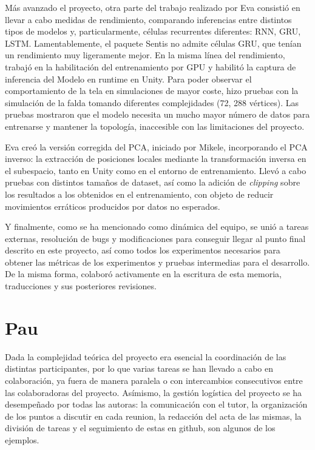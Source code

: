 Más avanzado el proyecto, otra parte del trabajo realizado por Eva consistió en llevar a cabo medidas de rendimiento, comparando inferencias entre distintos tipos de modelos y, particularmente, células recurrentes diferentes: RNN, GRU, LSTM. Lamentablemente, el paquete Sentis no admite células GRU, que tenían un rendimiento muy ligeramente mejor. En la misma línea del rendimiento, trabajó en la habilitación del entrenamiento por GPU y habilitó la captura de inferencia del Modelo en runtime en Unity.
Para poder observar el comportamiento de la tela en simulaciones de mayor coste, hizo pruebas con la simulación de la falda tomando diferentes complejidades (72, 288 vértices). Las pruebas mostraron que el modelo necesita un mucho mayor número de datos para entrenarse y mantener la topología, inaccesible con las limitaciones del proyecto. \newline

Eva creó la versión corregida del PCA, iniciado por Mikele, incorporando el PCA inverso: la extracción de posiciones locales mediante la transformación inversa en el subespacio, tanto en Unity como en el entorno de entrenamiento. Llevó a cabo pruebas con distintos tamaños de dataset, así como la adición de \textit{clipping} sobre los resultados a los obtenidos en el entrenamiento, con objeto de reducir movimientos erráticos producidos por datos no esperados. \newline

Y finalmente, como se ha mencionado como dinámica del equipo, se unió a tareas externas, resolución de bugs y modificaciones para conseguir llegar al punto final descrito en este proyecto, así como todos los experimentos necesarios para obtener las métricas de los experimentos y pruebas intermedias para el desarrollo. De la misma forma, colaboró activamente en la escritura de esta memoria, traducciones y sus posteriores revisiones.

\newpage
\section*{Pau}
Dada la complejidad teórica del proyecto era esencial la coordinación de las distintas participantes, por lo que varias tareas se han llevado a cabo en colaboración, ya fuera de manera paralela o con intercambios consecutivos entre las colaboradoras del proyecto. Asímismo, la gestión logística del proyecto se ha desempeñado por todas las autoras: la comunicación con el tutor, la organización de los puntos a discutir en cada reunion, la redacción del acta de las mismas, la división de tareas y el seguimiento de estas en github, son algunos de los ejemplos. \newline

